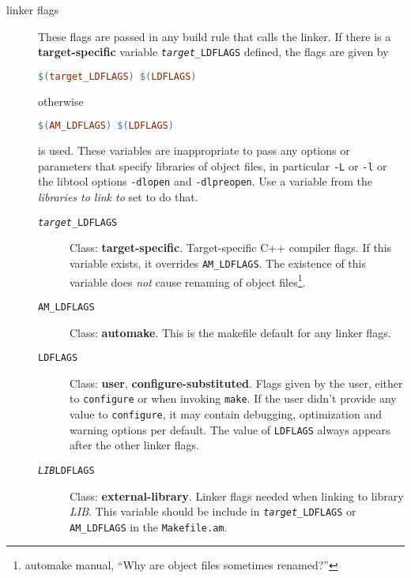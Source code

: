 \documentclass[11pt,a4paper,headinclude,footinclude,DIV16,normalheadings]{scrartcl}
\begin{document}
\begin{description}
\item[linker flags] These flags are passed in any build rule that calls the
  linker.  If there is a {\bf target-specific} variable
  \texttt{\textit{target}\_LDFLAGS} defined, the flags are given by
\begin{lstlisting}[language=make]
$(target_LDFLAGS) $(LDFLAGS)
\end{lstlisting}
  otherwise
\begin{lstlisting}[language=make]
$(AM_LDFLAGS) $(LDFLAGS)
\end{lstlisting}
  is used.  These variables are inappropriate to pass any options or parameters
  that specify libraries of object files, in particular \texttt{-L} or
  \texttt{-l} or the libtool options \texttt{-dlopen} and \texttt{-dlpreopen}.
  Use a variable from the {\em libraries to link to} set to do that.
  \begin{description}
  \item[\texttt{\textit{target}\_LDFLAGS}] Class: {\bf target-specific}.
    Target-specific C++ compiler flags.  If this variable exists, it overrides
    \texttt{AM\_LDFLAGS}.  The existence of this variable does {\em not} cause
    renaming of object files\footnote{automake manual, ``Why are object files
      sometimes renamed?''}.
  \item[\texttt{AM\_LDFLAGS}] Class: {\bf automake}.  This is the makefile
    default for any linker flags.
  \item[\texttt{LDFLAGS}] Class: {\bf user}, {\bf configure-substituted}.
    Flags given by the user, either to \texttt{configure} or when invoking
    \texttt{make}.  If the user didn't provide any value to
    \texttt{configure}, it may contain debugging, optimization and warning
    options per default.  The value of \texttt{LDFLAGS} always appears after
    the other linker flags.
  \item[\texttt{\textit{LIB}LDFLAGS}] Class: {\bf external-library}.  Linker
    flags needed when linking to library \textit{LIB}.  This variable should
    be include in \texttt{\textit{target}\_LDFLAGS} or \texttt{AM\_LDFLAGS} in
    the \texttt{Makefile.am}.
  \end{description}


\end{description}
\end{document}
